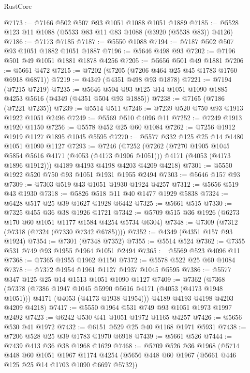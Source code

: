 \begin{lexlean}{RustCore}
\begin{coremodule}
@7173 := @7166 @502 @507 @93 @1051 @1088 @1051 @1889
@7185 := @5528 @123 @11 @1088 (@5533 @83 @11 @83 @1088 (@3920 (@5538 @83)) @4126)
@7186 := @7173 @7185
@7187 := @5550 @1088
@7194 := @7187 @502 @507 @93 @1051 @1882 @1051 @1887
@7196 := @5646 @498 @93
@7202 := @7196 @501 @49 @1051 @1881 @1878 @4256
@7205 := @5656 @501 @49 @1881
@7206 := @5661 @472
@7215 := @7202 (@7205 (@7206 @464 @25 @45 @1783 @1760 @6918 @6871))
@7219 := @4349 (@4351 @498 @93 @1878)
@7221 := @7194 (@7215 @7219)
@7235 := @5646 @504 @93 @125 @14 @1051 @1090 @1885 @4253 @5616 (@4349 (@4351 @504 @93 @1885))
@7238 := @7165 (@7186 (@7221 @7235))
@7239 := @5514 @511
@7246 := @7239 @520 @750 @93 @1913 @1922 @1051 @2496
@7249 := @5569 @510 @4096 @11
@7252 := @7249 @1913 @1920 @1150
@7256 := @5578 @452 @25 @60 @1084
@7262 := @7256 @1912 @1919 @1127 @1895 @1045 @5595
@7270 := @5577 @332 @125 @25 @14 @1480 @1051 @1090 @1127
@7293 := @7246
    (@7252
      (@7262
        (@7270 @1905 @1045 @5854 @5616 @4171 (@4053 (@4173 @1906 @1051)))
        @4171
        (@4053 (@4173 @1896 @1912)))
      @4189
      @4193
      @4198
      @4203
      @4209
      @4218)
@7301 := @5550 @1922 @520 @750 @93 @1051 @1931 @1955 @2494
@7303 := @5646 @157 @93
@7309 := @7303 @519 @43 @1051 @1930 @1924 @4257
@7312 := @5656 @519 @43 @1930
@7318 := @5826 @518 @11 @40 @1477 @1929 @5838
@7324 := @6428 @517 @25 @39 @1627 @1928 @6442
@7325 := @5661 @515
@7330 := @7325 @455 @36 @38 @1926 @1721
@7342 := @5709 @515 @36 @1926 (@6273 @170 @60 @1051 @1177 @1584 @4254 @5734 @6304)
@7348 := @7309 (@7312 (@7318 (@7324 (@7330 @7342 @6785))))
@7352 := @4349 (@4351 @157 @93 @1924)
@7354 := @7301 (@7348 @7352)
@7355 := @5514 @524
@7362 := @7355 @531 @749 @93 @1955 @1964 @1051 @2494
@7365 := @5569 @523 @4096 @11
@7368 := @7365 @1955 @1962 @1150
@7372 := @5578 @522 @25 @60 @1084
@7378 := @7372 @1954 @1961 @1127 @1937 @1045 @5595
@7386 := @5577 @347 @125 @25 @14 @1513 @1051 @1090 @1127
@7409 := @7362
    (@7368
      (@7378
        (@7386 @1947 @1045 @5990 @5616 @4171 (@4053 (@4173 @1948 @1051)))
        @4171
        (@4053 (@4173 @1938 @1954)))
      @4189
      @4193
      @4198
      @4203
      @4209
      @4218)
@7417 := @5550 @1964 @531 @749 @93 @1051 @1973 @1997 @2492
@7423 := @6242 @530 @41 @1051 @1972 @1165 @4257
@7426 := @5656 @530 @41 @1972
@7432 := @6151 @529 @25 @40 @1168 @1971 @5931
@7438 := @7206 @528 @25 @39 @1783 @1970 @6918
@7439 := @5661 @526
@7444 := @7439 @413 @36 @38 @1968 @1629
@7468 := @5709
    @526
    @36
    @1968
    (@5714
      @448
      @60
      @1051
      @1967
      @1174
      @4254
      (@5656 @448 @60 @1967 (@5661 @446 @125 @25 @14 @1703 @1090 @6697 @5732))

\end{coremodule}
\end{lexlean}
